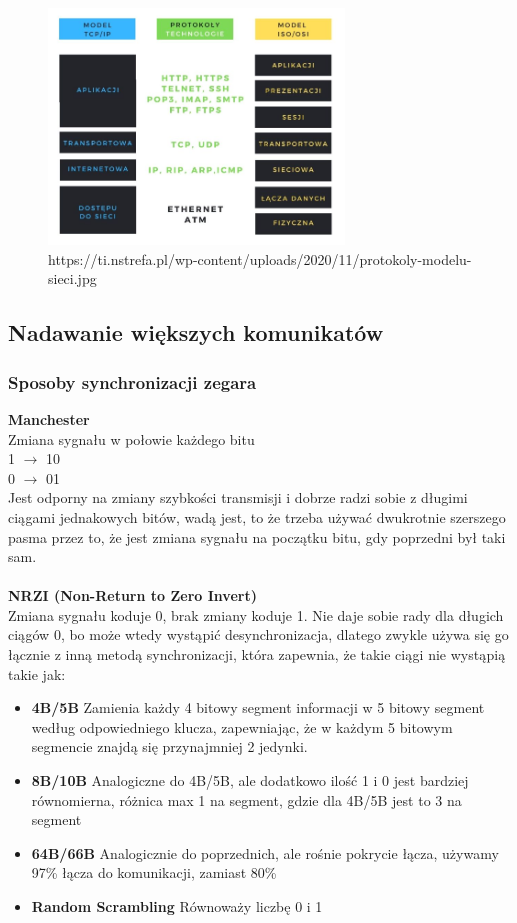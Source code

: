 \documentclass[]{article}
\begin{document}
\begin{figure}[H]
    \centering
    \includegraphics[width=0.7\textwidth]{model.png}
    {\tiny https://ti.nstrefa.pl/wp-content/uploads/2020/11/protokoly-modelu-sieci.jpg}
\end{figure}

\subsection{Nadawanie większych komunikatów}
\subsubsection{Sposoby synchronizacji zegara}
\textbf{Manchester} \\
Zmiana sygnału w połowie każdego bitu \\
1 $\rightarrow$ 10 \\
0 $\rightarrow$ 01 \\
Jest odporny na zmiany szybkości transmisji i dobrze radzi sobie z długimi ciągami jednakowych bitów, wadą jest, to że trzeba używać dwukrotnie szerszego pasma przez to, że jest zmiana sygnału na początku bitu, gdy poprzedni był taki sam.\\\\
\textbf{NRZI (Non-Return to Zero Invert)} \\
Zmiana sygnału koduje 0, brak zmiany koduje 1. Nie daje sobie rady dla długich ciągów 0, bo może wtedy wystąpić desynchronizacja, dlatego zwykle używa się go łącznie z inną metodą synchronizacji, która zapewnia, że takie ciągi nie wystąpią takie jak:
\begin{itemize}
    \item \textbf{4B/5B}
    Zamienia każdy 4 bitowy segment informacji w 5 bitowy segment według odpowiedniego klucza, zapewniając, że w każdym 5 bitowym segmencie znajdą się przynajmniej 2 jedynki.
    \item \textbf{8B/10B}
    Analogiczne do 4B/5B, ale dodatkowo ilość 1 i 0 jest bardziej równomierna, różnica max 1 na segment, gdzie dla 4B/5B jest to 3 na segment
    \item \textbf{64B/66B}
    Analogicznie do poprzednich, ale rośnie pokrycie łącza, używamy 97\% łącza do komunikacji, zamiast 80\%
    \item \textbf{Random Scrambling}
    Równoważy liczbę 0 i 1
\end{itemize}
\end{document}
